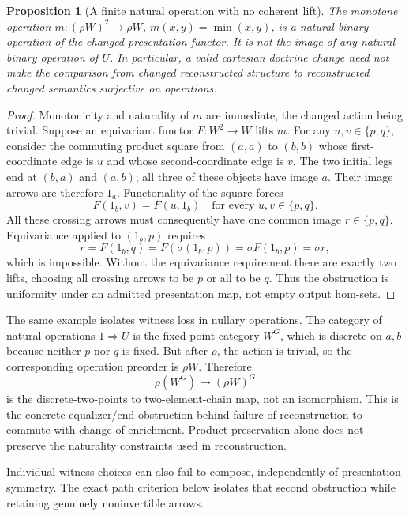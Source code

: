 \documentclass[11pt]{article}
\newtheorem{proposition}[theorem]{Proposition}
\theoremstyle{definition}
\theoremstyle{remark}
\begin{document}
\begin{proposition}[A finite natural operation with no coherent lift]
\label{prop:dc-meet}
The monotone operation
$m:(\rho W)^2\to \rho W$, $m(x,y)=\min(x,y)$, is a natural binary operation of
the changed presentation functor. It is not the image of any natural
binary operation of $U$. In particular, a valid cartesian doctrine
change need not make the comparison from changed reconstructed structure
to reconstructed changed semantics surjective on operations.
\end{proposition}
\begin{proof}
Monotonicity and naturality of $m$ are immediate, the changed action
being trivial. Suppose an equivariant functor $F:W^2\to W$ lifts $m$.
For any $u,v\in\{p,q\}$, consider the commuting product square from
$(a,a)$ to $(b,b)$ whose first-coordinate edge is $u$ and whose
second-coordinate edge is $v$. The two initial legs end at $(b,a)$ and
$(a,b)$; all three of these objects have image $a$. Their image arrows
are therefore $1_a$. Functoriality of the square forces
\[
 F(1_b,v)=F(u,1_b) \quad\text{for every }u,v\in\{p,q\}.
\]
All these crossing arrows must consequently have one common image
$r\in\{p,q\}$. Equivariance applied to $(1_b,p)$ requires
\[
 r=F(1_b,q)=F(\sigma(1_b,p))=\sigma F(1_b,p)=\sigma r,
\]
which is impossible. Without the equivariance requirement there are
exactly two lifts, choosing all crossing arrows to be $p$ or all to be
$q$. Thus the obstruction is uniformity under an admitted presentation
map, not empty output hom-sets.
\end{proof}

The same example isolates witness loss in nullary operations. The
category of natural operations $1\Rightarrow U$ is the fixed-point
category $W^G$, which is discrete on $a,b$ because neither $p$ nor $q$
is fixed. But after $\rho$, the action is trivial, so the corresponding
operation preorder is  $\rho W$. Therefore
\[
 \rho(W^G)\longrightarrow (\rho W)^G
\]
is the discrete-two-points to two-element-chain map, not an isomorphism.
This is the concrete equalizer/end obstruction behind failure of
reconstruction to commute with change of enrichment. Product preservation
alone does not preserve the naturality constraints used in reconstruction.

Individual witness choices can also fail to compose, independently of
presentation symmetry. The exact path criterion below isolates that second
obstruction while retaining genuinely noninvertible arrows.
\end{document}
